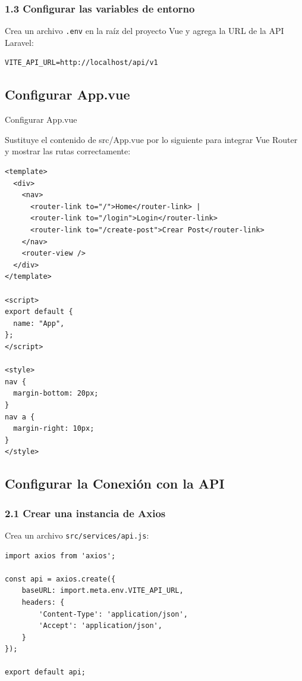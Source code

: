 \documentclass[11pt]{article}
\begin{document}
\subsubsection{1.3 Configurar las variables de entorno}
\label{sec:org28618a6}
Crea un archivo \texttt{.env} en la raíz del proyecto Vue y agrega la URL de la API Laravel:

\begin{verbatim}
VITE_API_URL=http://localhost/api/v1
\end{verbatim}
\subsection{Configurar App.vue}
\label{sec:org10b3947}
Configurar App.vue

Sustituye el contenido de src/App.vue por lo siguiente para integrar
Vue Router y mostrar las rutas correctamente:
\begin{verbatim}
<template>
  <div>
    <nav>
      <router-link to="/">Home</router-link> |
      <router-link to="/login">Login</router-link>
      <router-link to="/create-post">Crear Post</router-link>
    </nav>
    <router-view />
  </div>
</template>

<script>
export default {
  name: "App",
};
</script>

<style>
nav {
  margin-bottom: 20px;
}
nav a {
  margin-right: 10px;
}
</style>

\end{verbatim}

\subsection{Configurar la Conexión con la API}
\label{sec:orge406a0b}

\subsubsection{2.1 Crear una instancia de Axios}
\label{sec:orga1963c4}
Crea un archivo \texttt{src/services/api.js}:

\begin{verbatim}
import axios from 'axios';

const api = axios.create({
    baseURL: import.meta.env.VITE_API_URL,
    headers: {
        'Content-Type': 'application/json',
        'Accept': 'application/json',
    }
});

export default api;
\end{verbatim}
\end{document}
